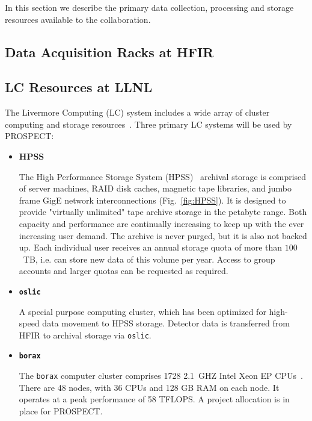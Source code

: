 In this section we describe the primary data collection, processing and storage resources available to the collaboration. 

\subsection{Data Acquisition Racks at HFIR}

\subsection{LC Resources at LLNL}
The Livermore Computing (LC) system includes a wide array of cluster computing and storage resources~\cite{lc}. Three primary LC systems will be used by PROSPECT:
\begin{itemize}
\item \textbf{HPSS}

The High Performance Storage System (HPSS)~\cite{HPSS} archival storage is comprised of server machines, RAID disk caches, magnetic tape libraries, and jumbo frame GigE network interconnections (Fig.~\ref{fig:HPSS}). 
It is designed to provide "virtually unlimited" tape archive storage in the petabyte range. Both capacity and performance are continually increasing to keep up with the ever increasing user demand.
The archive is never purged, but it is also not backed up.
Each individual user receives an annual storage quota of more than $100$~TB, i.e. can store new data of this volume per year. Access to group accounts and larger quotas can be requested as required.

\item \textbf{\texttt{oslic}}

A special purpose computing cluster, which has been optimized for high-speed data movement to HPSS storage. Detector data is transferred from HFIR to archival storage via \texttt{oslic}.

\item \textbf{\texttt{borax}}

The \texttt{borax} computer cluster comprises 1728 2.1~GHZ Intel Xeon EP CPUs~\cite{borax}. There are 48 nodes, with 36 CPUs and 128 GB RAM on each node. It operates at a peak performance of 58 TFLOPS. A project allocation is in place for PROSPECT. 

\end{itemize}

